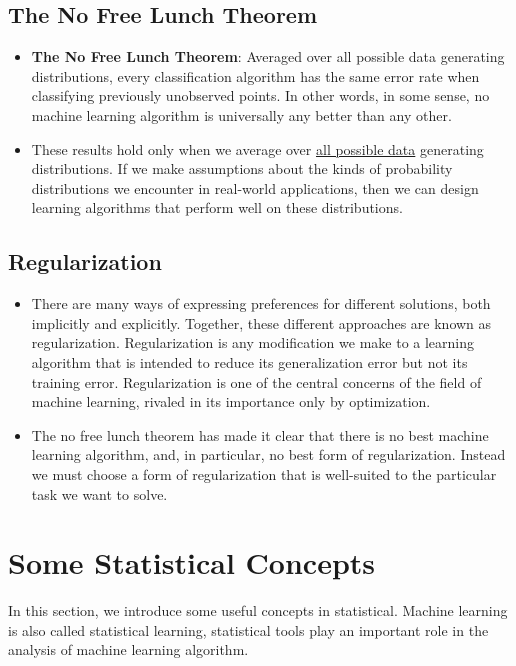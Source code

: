 \subsection{The No Free Lunch Theorem}
    \begin{itemize}
        \item  \textbf{The No Free Lunch Theorem}: Averaged over all possible data generating distributions, every classification algorithm has the
        same error rate when classifying previously unobserved points. In other words, in some sense, no machine learning algorithm is universally any better than any other.
        \item  These results hold only when we average over \underline{all possible data} generating distributions. If we make assumptions about the kinds of probability distributions we encounter in real-world applications, then we can design learning
        algorithms that perform well on these distributions.
    \end{itemize}

\subsection{Regularization}
    \begin{itemize}
        \item There are many ways of expressing preferences for different solutions, both implicitly and explicitly. Together, these different approaches
        are known as regularization. Regularization is any modification we make to a learning algorithm that is intended to reduce its generalization error but not its training error. Regularization is one of the central concerns of the field of machine learning, rivaled in its importance only by optimization.
        \item The no free lunch theorem has made it clear that there is no best machine learning algorithm, and, in particular, no best form of regularization. Instead	we must choose a form of regularization that is well-suited to the particular task we want to solve.
    \end{itemize}

\section{Some Statistical Concepts}
In this section, we introduce some useful concepts in statistical. Machine learning is also called statistical learning, statistical tools play an important role in the analysis of machine learning algorithm. 

